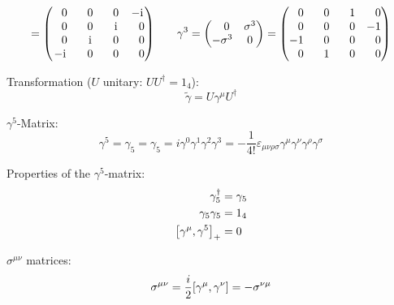 \begin{equation}
\begin{aligned}
					= \left( \begin{matrix}
					\M 0 & \M 0 & \M 0 &  -\i \\
					\M 0 & \M 0 & \M\i & \M 0 \\
					\M 0 & \M\i & \M 0 & \M 0 \\
					-\i & \M 0 & \M 0 & \M 0 \\
					\end{matrix} \right)
					&\hspace{20pt}
					\gamma^3
					= \left( \begin{matrix}
					\M 0 & \sigma^3 \\
					-\sigma^3 &  0
					\end{matrix} \right)
					= \left( \begin{matrix}
					\M 0 & \M 0 & \M 1 & \M 0 \\
					\M 0 & \M 0 & \M 0 &   -1 \\
					-1 & \M 0 & \M 0 & \M 0 \\
					\M 0 & \M 1 & \M 0 & \M 0 \\
					\end{matrix} \right) \\
				\end{aligned}
			\end{equation}

			\noindent
			Transformation ($U$ unitary: $U U^\dagger=1_4$):
			\begin{equation}
				\tilde{\gamma} = U \gamma^\mu U^\dagger
			\end{equation}

			\noindent
			$\gamma^5$-Matrix:
			\begin{equation}
				\gamma^5 = \gamma_5 = \gamma_5 = i\gamma^0 \gamma^1 \gamma^2 \gamma^3 = -\frac{1}{4!}\varepsilon_{\mu\nu\rho\sigma} \gamma^\mu \gamma^\nu \gamma^\rho \gamma^\sigma
			\end{equation}

			\noindent
			Properties of the $\gamma^5$-matrix:
			\begin{equation}
				\begin{aligned}
					\gamma_5^\dagger &= \gamma_5 \\
					\gamma_5 \gamma_5 &= 1_4 \\
					\left[\gamma^\mu,\gamma^5\right]_{+} &= 0 \\
				\end{aligned}
			\end{equation}

			\noindent
			$\sigma^{\mu\nu}$ matrices:
			\begin{equation}
				\sigma^{\mu\nu} = \frac{i}{2}\comm{\gamma^\mu}{\gamma^\nu} = -\sigma^{\nu\mu}
			\end{equation}


